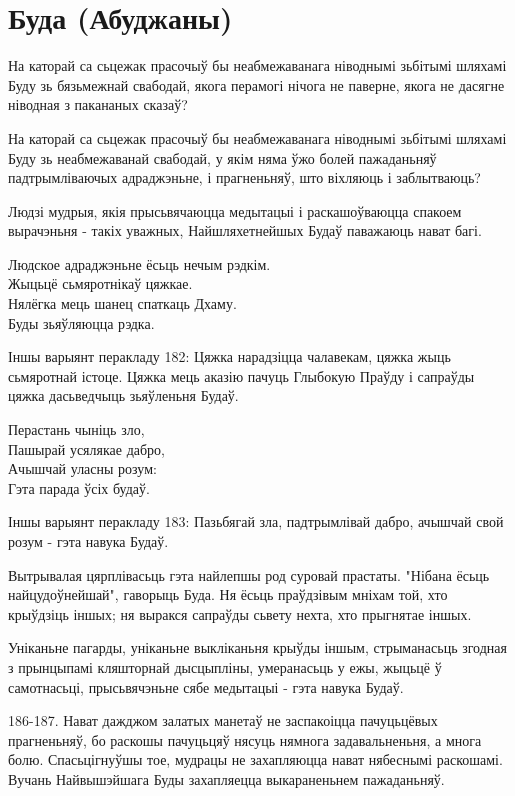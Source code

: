 \documentclass{article}
\begin{document}
\section{Буда (Абуджаны)}

На каторай са сьцежак прасочыў бы неабмежаванага ніводнымі зьбітымі
шляхамі Буду зь бязьмежнай свабодай, якога перамогі нічога не паверне,
якога не дасягне ніводная з пакананых сказаў?

На каторай са сьцежак прасочыў бы неабмежаванага ніводнымі зьбітымі
шляхамі Буду зь неабмежаванай свабодай, у якім няма ўжо болей
пажаданьняў падтрымліваючых адраджэньне, і прагненьняў, што віхляюць і
заблытваюць?

Людзі мудрыя, якія прысьвячаюцца медытацыі і раскашоўваюцца спакоем
вырачэньня - такіх уважных, Найшляхетнейшых Будаў паважаюць нават багі.

Людское адраджэньне ёсьць нечым рэдкім.\\
Жыцьцё сьмяротнікаў цяжкае.\\
Нялёгка мець шанец спаткаць Дхаму.\\
Буды зьяўляюцца рэдка.

Іншы варыянт перакладу 182: Цяжка нарадзіцца чалавекам, цяжка жыць
сьмяротнай істоце. Цяжка мець аказію пачуць Глыбокую Праўду і сапраўды
цяжка дасьведчыць зьяўленьня Будаў.

Перастань чыніць зло,\\
Пашырай усялякае дабро,\\
Ачышчай уласны розум:\\
Гэта парада ўсіх будаў.

Іншы варыянт перакладу 183: Пазьбягай зла, падтрымлівай дабро, ачышчай
свой розум - гэта навука Будаў.

Вытрывалая цярплівасьць гэта найлепшы род суровай прастаты. "Нібана
ёсьць найцудоўнейшай", гаворыць Буда. Ня ёсьць праўдзівым мніхам той,
хто крыўдзіць іншых; ня выракся сапраўды сьвету нехта, хто прыгнятае
іншых.

Уніканьне пагарды, уніканьне выкліканьня крыўды іншым, стрыманасьць
згодная з прынцыпамі кляшторнай дысцыпліны, умеранасьць у ежы, жыцьцё ў
самотнасьці, прысьвячэньне сябе медытацыі - гэта навука Будаў.

186-187. Нават дажджом залатых манетаў не заспакоіцца пачуцьцёвых
прагненьняў, бо раскошы пачуцьцяў нясуць нямнога задавальненьня, а многа
болю. Спасьцігнуўшы тое, мудрацы не захапляюцца нават нябеснымі
раскошамі. Вучань Найвышэйшага Буды захапляецца выкараненьнем
пажаданьняў.
\end{document}
